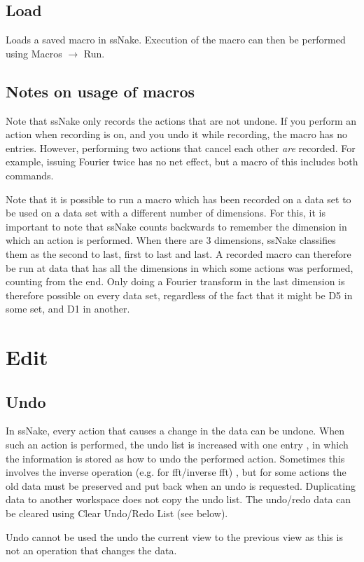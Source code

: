\documentclass[11pt,a4paper]{article}
\begin{document}
\subsection{Load}
Loads a saved macro in ssNake. Execution of the macro can then be performed using Macros $\rightarrow$ Run.

\subsection{Notes on usage of macros}
Note that ssNake only records the actions that are not undone. If you perform an action when recording is on, 
and you undo it while recording, the macro has no entries. However, performing two actions that cancel each other
\textit{are} recorded. For example, issuing Fourier twice has no net effect, but a macro of this includes both commands.

Note that it is possible to run a macro which has been recorded on a data set to
be used on a data set with a different number of dimensions.
For this, it is important to note that ssNake counts backwards to remember the dimension in which an action is performed. When there are 3 dimensions,
ssNake classifies them as the second to last, first to last and last. A recorded macro can therefore be run at data that has all the dimensions in which some actions was performed,
counting from the end. Only doing a Fourier transform in the last dimension is therefore possible on every data set, regardless of the fact that it might be D5 in some set,
and D1 in another.



\section{Edit}
\subsection{Undo}
In ssNake, every action that causes a change in the data can be undone. When such an action is performed, the undo list is increased with one entry
, in which the information is stored as how to undo the performed action. Sometimes this involves the inverse operation (e.g. for fft/inverse fft)
, but for some actions the old data must be preserved and put back when an undo is requested. Duplicating data to another workspace does not copy
the undo list. The undo/redo data can be cleared using Clear Undo/Redo List (see below).

Undo cannot be used the undo the current view to the previous view as this is not an operation that changes the data.
\end{document}
